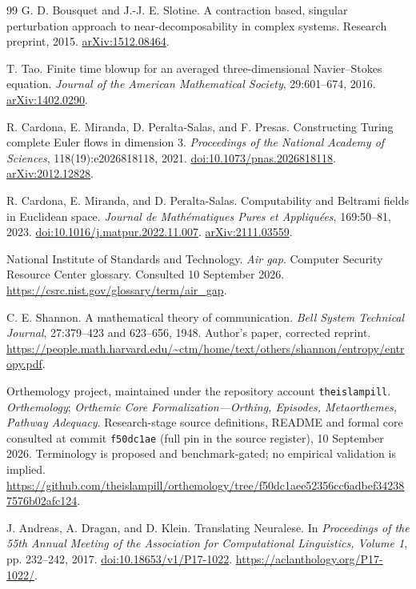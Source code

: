 \begin{thebibliography}{99}
G. D. Bousquet and J.-J. E. Slotine. A contraction based, singular perturbation approach to near-decomposability in complex systems. Research preprint, 2015. \href{https://arxiv.org/abs/1512.08464}{arXiv:1512.08464}.

T. Tao. Finite time blowup for an averaged three-dimensional Navier--Stokes equation. \emph{Journal of the American Mathematical Society}, 29:601--674, 2016. \href{https://arxiv.org/abs/1402.0290}{arXiv:1402.0290}.

R. Cardona, E. Miranda, D. Peralta-Salas, and F. Presas. Constructing Turing complete Euler flows in dimension 3. \emph{Proceedings of the National Academy of Sciences}, 118(19):e2026818118, 2021. \href{https://doi.org/10.1073/pnas.2026818118}{doi:10.1073/pnas.2026818118}. \href{https://arxiv.org/abs/2012.12828}{arXiv:2012.12828}.

R. Cardona, E. Miranda, and D. Peralta-Salas. Computability and Beltrami fields in Euclidean space. \emph{Journal de Math\'ematiques Pures et Appliqu\'ees}, 169:50--81, 2023. \href{https://doi.org/10.1016/j.matpur.2022.11.007}{doi:10.1016/j.matpur.2022.11.007}. \href{https://arxiv.org/abs/2111.03559}{arXiv:2111.03559}.

National Institute of Standards and Technology. \emph{Air gap}. Computer Security Resource Center glossary. Consulted 10 September 2026. \url{https://csrc.nist.gov/glossary/term/air_gap}.

C. E. Shannon. A mathematical theory of communication. \emph{Bell System Technical Journal}, 27:379--423 and 623--656, 1948. Author's paper, corrected reprint. \url{https://people.math.harvard.edu/~ctm/home/text/others/shannon/entropy/entropy.pdf}.

Orthemology project, maintained under the repository account \texttt{theislampill}. \emph{Orthemology}; \emph{Orthemic Core Formalization---Orthing, Episodes, Metaorthemes, Pathway Adequacy}. Research-stage source definitions, README and formal core consulted at commit \texttt{f50dc1ae} (full pin in the source register), 10 September 2026. Terminology is proposed and benchmark-gated; no empirical validation is implied. \url{https://github.com/theislampill/orthemology/tree/f50dc1aee52356cc6adbef342387576b02afc124}.

J. Andreas, A. Dragan, and D. Klein. Translating Neuralese. In \emph{Proceedings of the 55th Annual Meeting of the Association for Computational Linguistics, Volume 1}, pp. 232--242, 2017. \href{https://doi.org/10.18653/v1/P17-1022}{doi:10.18653/v1/P17-1022}. \url{https://aclanthology.org/P17-1022/}.


\end{thebibliography}
